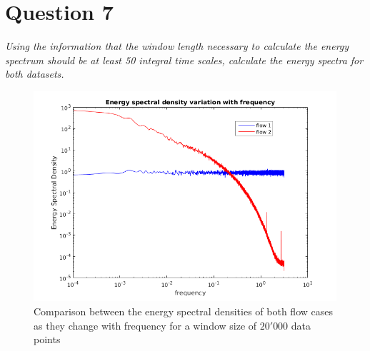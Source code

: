 \section*{Question 7}
\textit{Using the information that the window length necessary to calculate the energy spectrum should be at least 50 integral time scales, calculate the energy spectra for both datasets.}

\begin{figure}[!ht]
\centering
\includegraphics[scale=0.8]{./TEXT/esd.png}
\caption{Comparison between the energy spectral densities of both flow cases as they change with frequency for a window size of $20'000$ data points}
\label{esd}
\end{figure}